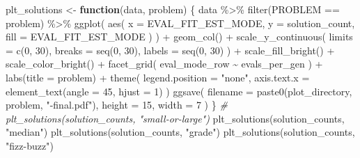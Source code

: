 \documentclass[
]{book}
\newenvironment{Shaded}{\begin{snugshade}}{\end{snugshade}}
\newcommand{\AttributeTok}[1]{\textcolor[rgb]{0.77,0.63,0.00}{#1}}
\newcommand{\CommentTok}[1]{\textcolor[rgb]{0.56,0.35,0.01}{\textit{#1}}}
\newcommand{\ControlFlowTok}[1]{\textcolor[rgb]{0.13,0.29,0.53}{\textbf{#1}}}
\newcommand{\DecValTok}[1]{\textcolor[rgb]{0.00,0.00,0.81}{#1}}
\newcommand{\FunctionTok}[1]{\textcolor[rgb]{0.00,0.00,0.00}{#1}}
\newcommand{\NormalTok}[1]{#1}
\newcommand{\OtherTok}[1]{\textcolor[rgb]{0.56,0.35,0.01}{#1}}
\newcommand{\SpecialCharTok}[1]{\textcolor[rgb]{0.00,0.00,0.00}{#1}}
\newcommand{\StringTok}[1]{\textcolor[rgb]{0.31,0.60,0.02}{#1}}
\begin{document}
\begin{Shaded}
\begin{Highlighting}[]
\NormalTok{plt\_solutions }\OtherTok{\textless{}{-}} \ControlFlowTok{function}\NormalTok{(data, problem) \{}
\NormalTok{  data }\SpecialCharTok{\%\textgreater{}\%}
    \FunctionTok{filter}\NormalTok{(PROBLEM }\SpecialCharTok{==}\NormalTok{ problem) }\SpecialCharTok{\%\textgreater{}\%}
    \FunctionTok{ggplot}\NormalTok{(}
      \FunctionTok{aes}\NormalTok{(}
        \AttributeTok{x =}\NormalTok{ EVAL\_FIT\_EST\_MODE,}
        \AttributeTok{y =}\NormalTok{ solution\_count,}
        \AttributeTok{fill =}\NormalTok{ EVAL\_FIT\_EST\_MODE}
\NormalTok{      )}
\NormalTok{    ) }\SpecialCharTok{+}
    \FunctionTok{geom\_col}\NormalTok{() }\SpecialCharTok{+}
    \FunctionTok{scale\_y\_continuous}\NormalTok{(}
      \AttributeTok{limits =} \FunctionTok{c}\NormalTok{(}\DecValTok{0}\NormalTok{, }\DecValTok{30}\NormalTok{),}
      \AttributeTok{breaks =} \FunctionTok{seq}\NormalTok{(}\DecValTok{0}\NormalTok{, }\DecValTok{30}\NormalTok{),}
      \AttributeTok{labels =} \FunctionTok{seq}\NormalTok{(}\DecValTok{0}\NormalTok{, }\DecValTok{30}\NormalTok{)}
\NormalTok{    ) }\SpecialCharTok{+}
    \FunctionTok{scale\_fill\_bright}\NormalTok{() }\SpecialCharTok{+}
    \FunctionTok{scale\_color\_bright}\NormalTok{() }\SpecialCharTok{+}
    \FunctionTok{facet\_grid}\NormalTok{(}
\NormalTok{       eval\_mode\_row }\SpecialCharTok{\textasciitilde{}}\NormalTok{ evals\_per\_gen}
\NormalTok{    ) }\SpecialCharTok{+}
    \FunctionTok{labs}\NormalTok{(}\AttributeTok{title =}\NormalTok{ problem) }\SpecialCharTok{+}
    \FunctionTok{theme}\NormalTok{(}
      \AttributeTok{legend.position =} \StringTok{"none"}\NormalTok{,}
      \AttributeTok{axis.text.x =} \FunctionTok{element\_text}\NormalTok{(}\AttributeTok{angle =} \DecValTok{45}\NormalTok{, }\AttributeTok{hjust =} \DecValTok{1}\NormalTok{)}
\NormalTok{    )}
  \FunctionTok{ggsave}\NormalTok{(}
    \AttributeTok{filename =} \FunctionTok{paste0}\NormalTok{(plot\_directory, problem, }\StringTok{"{-}final.pdf"}\NormalTok{),}
    \AttributeTok{height =} \DecValTok{15}\NormalTok{,}
    \AttributeTok{width =} \DecValTok{7}
\NormalTok{  )}
\NormalTok{\}}
\CommentTok{\# plt\_solutions(solution\_counts, "small{-}or{-}large")}
\FunctionTok{plt\_solutions}\NormalTok{(solution\_counts, }\StringTok{"median"}\NormalTok{)}
\FunctionTok{plt\_solutions}\NormalTok{(solution\_counts, }\StringTok{"grade"}\NormalTok{)}
\FunctionTok{plt\_solutions}\NormalTok{(solution\_counts, }\StringTok{"fizz{-}buzz"}\NormalTok{)}
\end{Highlighting}
\end{Shaded}
\end{document}
